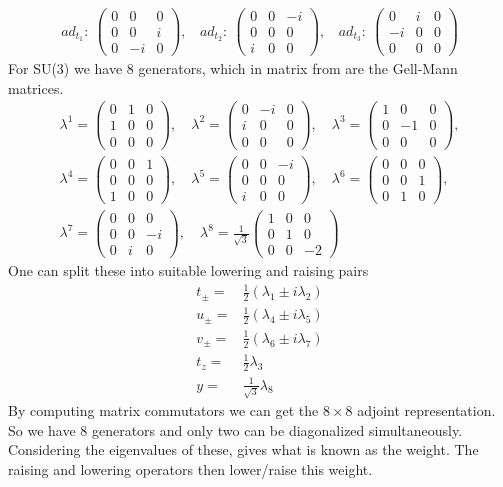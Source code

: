 \documentclass[a4paper,12pt]{article}
\newcommand\matthree[9]{%
	\begin{pmatrix}
		#1 & #2 & #3 \\ #4 & #5 & #6 \\ #7 & #8 & #9
	\end{pmatrix}%
}
\begin{document}
\begin{equation}
	\begin{aligned}
			ad_{t_1}:~\begin{pmatrix}
				0 & 0 & 0\\
				0 & 0 & i\\
				0 & -i & 0
			\end{pmatrix},~~~~
			ad_{t_2}:~\begin{pmatrix}
			0 & 0 & -i\\
			0 & 0 & 0\\
			i & 0 & 0
		\end{pmatrix},~~~~
	ad_{t_3}:~\begin{pmatrix}
	0 & i & 0\\
	-i & 0 & 0\\
	0 & 0 & 0
\end{pmatrix}
	\end{aligned}
\end{equation}
For SU(3) we have 8 generators, which in matrix from are the Gell-Mann matrices.
\begin{gather*}
	\lambda^1 = \matthree {0}{1}{0}{1}{0}{0}{0}{0}{0},\quad
	\lambda^2 = \matthree {0}{-i}{0}{i}{0}{0}{0}{0}{0},\quad
	\lambda^3 = \matthree {1}{0}{0}{0}{-1}{0}{0}{0}{0},\\[1ex]
	\lambda^4 = \matthree {0}{0}{1}{0}{0}{0}{1}{0}{0},\quad
	\lambda^5 = \matthree {0}{0}{-i}{0}{0}{0}{i}{0}{0},\quad
	\lambda^6 = \matthree {0}{0}{0}{0}{0}{1}{0}{1}{0},\\[1ex]
	\lambda^7 = \matthree {0}{0}{0}{0}{0}{-i}{0}{i}{0},\quad
	\lambda^8 = \frac{1}{\sqrt{3}} \matthree {1}{0}{0}{0}{1}{0}{0}{0}{-2}
\end{gather*}
One can split these into suitable lowering and raising pairs
\begin{equation}
	\begin{aligned}
		t_\pm=& \frac{1}{2}(\lambda_1\pm i\lambda_2)\\
		u_\pm=& \frac{1}{2}(\lambda_4\pm i\lambda_5)\\
			v_\pm=& \frac{1}{2}(\lambda_6\pm i\lambda_7)\\
			t_z=&\frac{1}{2}\lambda_3\\
			y=&\frac{1}{\sqrt{3}}\lambda_8
	\end{aligned}
\end{equation}
By computing matrix commutators we can get the $8\times 8$ adjoint representation.
So we have 8 generators and only two can be diagonalized simultaneously. Considering the eigenvalues of these, gives what is known as the weight. The raising and lowering operators then lower/raise this weight.
\end{document}
